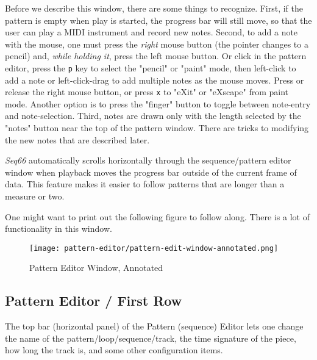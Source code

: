    Before we describe this window, there are some things to recognize.
   First, if the pattern is empty when play is started, the progress bar will
   still move, so that the user can play a MIDI instrument and record new notes.
   Second, to add a note with the mouse, one must press the \textsl{right}
   mouse button (the pointer changes to a pencil) and,
   \textsl{while holding it}, press the left mouse button.
   Or click in the pattern editor, press the
   \texttt{p} key to select the "pencil" or "paint" mode, then
   left-click to add a note or
   left-click-drag to add multiple notes as the mouse moves.
   Press or release the right mouse button, or press
   \texttt{x} to "eXit" or "eXscape" from paint mode.
   Another option is to press the "finger" button to toggle between note-entry
   and note-selection.
   Third, notes are drawn only with the length selected by the "notes" button
   near the top of the pattern window.  There are tricks to
   modifying the new notes that are described later.

   \textsl{Seq66} automatically scrolls
   horizontally through the sequence/pattern editor window when
   playback moves the progress bar outside of the current frame of data.  This
   feature makes it easier to follow patterns that are longer than a measure or
   two.

   One might want to print out the following figure to follow along.  There is
   a lot of functionality in this window.

\begin{figure}[H]
   \centering 
   \texttt{[image: pattern-editor/pattern-edit-window-annotated.png]}
   \caption{Pattern Editor Window, Annotated}
   \label{fig:pattern_editor_window_annotated}
\end{figure}

\subsection{Pattern Editor / First Row}
\label{subsec:pattern_editor_first_row}

   The top bar (horizontal panel) of the Pattern (sequence) Editor
   lets one change the name of
   the pattern/loop/sequence/track, the time signature of the piece, how long
   the track is, and some other configuration items.

